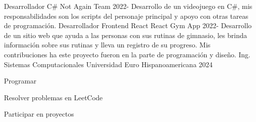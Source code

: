\documentclass[11pt]{spidercv}
\begin{document}
    \begin{MainPart}
    \Experience
        {\ColorHighlight}
		{Desarrollador C\#}
		{Not Again Team}
        {2022-\faUndo}
        {
	        Desarrollo de un videojuego en C\#, mis responsabilidades son los scripts del personaje principal y apoyo con otras tareas de programación.   
        }
    \Experience
	{\ColorHighlight}
		{Desarrollador Frontend React}
		{React Gym App}
	{2022-\faUndo}
	{
		Desarrollo de un sitio web que ayuda a las personas con sus rutinas de gimnasio, les brinda información sobre sus rutinas y lleva un registro de su progreso. Mis contribuciones ha este proyecto fueron en la parte de programación y diseño.
 	}   
    \Experience
        {\ColorHighlight}
		{Ing. Sistemas Computacionales}
		{Universidad Euro Hispanoamericana}
        {2024}
        {   
 		
        }

    \vspace*{0.5cm}
    \begin{DoubleColumns}
        \begin{ItemList}{\ColorHighlight}
            \item [] Programar
            \item [] Resolver problemas en LeetCode
        \end{ItemList}
        \nextcolumn
        \begin{ItemList}{\ColorHighlight}
            \item [] Participar en proyectos
        \end{ItemList}
    \end{DoubleColumns}

    \end{MainPart}

    
\end{document}

